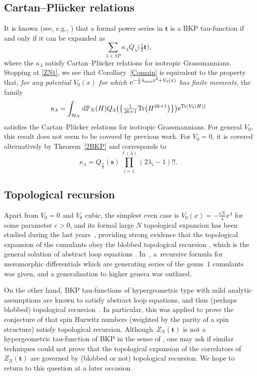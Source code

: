 \documentclass[10pt,a4paper]{amsart}
\numberwithin{equation}{section}
\newcommand{\dd}{\mathrm{d}}
\begin{document}
\subsection{Cartan--Pl\"ucker relations} It is known (see, e.g., \cite[Theorem~7.1.1]{harnad_balogh_2021}) that a formal power series in $\mathbf{t}$ is a
BKP tau-function if and only if it can be expanded as
\[
\sum_{\lambda \in SP} \kappa_\lambda
Q_\lambda\bigl(\tfrac{1}{2}\mathbf{t}\bigr),
\]
where the $\kappa_\lambda$ satisfy Cartan--Pl\"ucker relations for isotropic Grassmannians. Stopping at \eqref{ZNt}, we see that Corollary~\ref{Comain} is equivalent to the property that, \emph{for any potential
$V_0(x)$ for which ${\rm e}^{- \frac{1}{2}\lambda_{\min} x^2 + V_0(x)}$ has
finite moments}, the family
\begin{equation*}
\kappa_\lambda= \int_{\mathcal{H}_N} \dd \mathbb{P}_N(H)
 Q_{\lambda}\bigl(\bigl\{\tfrac{1}{2k+1}\mathrm{Tr}\bigl(H^{2k+1}\bigr)\bigr\}\bigr) {\rm e}^{\mathrm{Tr}(V_0(H))}
\end{equation*}
satisfies the Cartan--Pl\"ucker relations for isotropic Grassmannians. For general $V_0$, this result
does not seem to be covered by previous work. For $V_0 = 0$, it is covered alternatively by Theorem~\ref{2BKP} and corresponds to
\[
\kappa_\lambda= Q_{\frac{\lambda}{2}}(\mathbf{s}) \prod_{i = 1}^{\ell(\lambda)} (2\lambda_i - 1)!!.
\]

\subsection{Topological recursion} Apart from $V_0 = 0$ and $V_0$ cubic, the simplest even case is
$V_0(x)= -\frac{cN}{4}x^4$ for some parameter $c > 0$, and its formal
large $N$ topological expansion has been studied during the last years~\mbox{\cite{Grosse:2019jnv, Schurmann:2019mzu}},
providing strong evidence
\cite{Branahl:2020yru} that the topological expansion of the cumulants
obey the blobbed topological recursion \cite{Borot:2015hna}, which is
the general solution of abstract loop equations \cite{Borot:2013lpa}.
In~\cite{Hock:2023nki}, a~recursive formula for meromorphic
differentials which are generating series of the genus~$1$ cumulants
was given, and a generalisation to higher genera was outlined.

On the other hand, BKP tau-functions of hypergeometric type with mild analytic assumptions are known to satisfy abstract loop equations, and thus (perhaps blobbed) topological recursion~\cite{SA}. In particular, this was applied to prove the conjecture of \cite{GKL} that spin Hurwitz numbers (weighted by the parity of a spin structure) satisfy topological recursion. Although~$Z_N(\mathbf{t})$ is not a hypergeometric tau-function of BKP in the sense of \cite{Orlov}, one may ask if similar techniques could not prove that the topological expansion of the correlators of $Z_N(\mathbf{t})$ are governed by (blobbed or not) topological recursion. We hope to return to this question at a later occasion.
\end{document}
